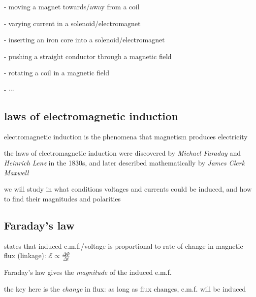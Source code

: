 \begin{compactenum}
	\item[-] moving a magnet towards/away from a coil
	
	\item[-] varying current in a solenoid/electromagnet
	
	\item[-] inserting an iron core into a solenoid/electromagnet
	
	\item[-] pushing a straight conductor through a magnetic field
	
	\item[-] rotating a coil in a magnetic field
	
	\item[-] $\cdots$
\end{compactenum}



\subsection{laws of electromagnetic induction}

electromagnetic induction is the phenomena that magnetism produces electricity

the laws of electromagnetic induction were discovered by \emph{Michael Faraday} and \emph{Heinrich Lenz} in the 1830s, and later described mathematically by \emph{James Clerk Maxwell}

we will study in what conditions voltages and currents could be induced, and how to find their magnitudes and polarities

\subsection{Faraday's law}

\rcyskip

\begin{ilight}
	 states that induced e.m.f./voltage is proportional to rate of change in magnetic flux (linkage): $\boxed{\mathcal{E} \propto \frac{\Delta \Phi}{\Delta t}}$
\end{ilight}

\cmt Faraday's law gives the \emph{magnitude} of the induced e.m.f.

the key here is the \emph{change} in flux: as long as flux changes, e.m.f. will be induced

